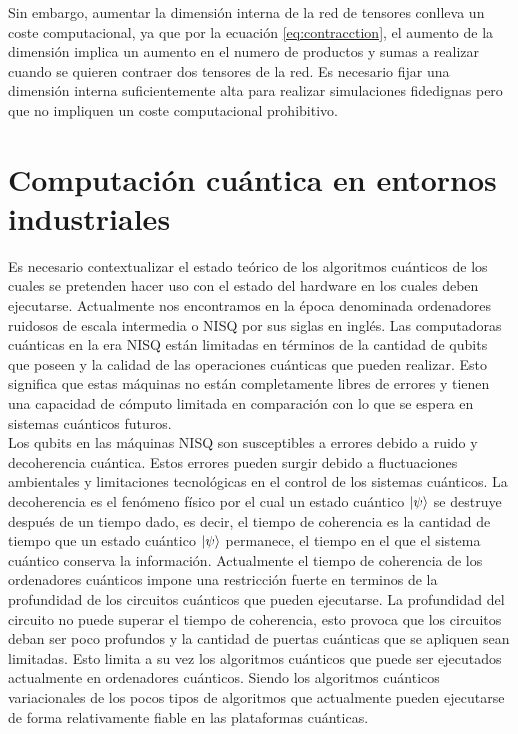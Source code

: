 \newpage

Sin embargo, aumentar la dimensión interna de la red de tensores conlleva un coste computacional, ya que por la ecuación \ref{eq:contracction}, el aumento de la dimensión implica un aumento en el numero de productos y sumas a realizar cuando se quieren contraer dos tensores de la red. Es necesario fijar una dimensión interna suficientemente alta para realizar simulaciones fidedignas pero que no impliquen un coste computacional prohibitivo.


\section{Computación cuántica en entornos industriales}

Es necesario contextualizar el estado teórico de los algoritmos cuánticos de los cuales se pretenden hacer uso con el estado del hardware en los cuales deben ejecutarse. Actualmente nos encontramos en la época denominada  ordenadores ruidosos de escala intermedia o NISQ por sus siglas en inglés. Las computadoras cuánticas en la era NISQ están limitadas en términos de la cantidad de qubits que poseen y la calidad de las operaciones cuánticas que pueden realizar. Esto significa que estas máquinas no están completamente libres de errores y tienen una capacidad de cómputo limitada en comparación con lo que se espera en sistemas cuánticos futuros. \\

 Los qubits en las máquinas NISQ son susceptibles a errores debido a ruido y decoherencia cuántica. Estos errores pueden surgir debido a fluctuaciones ambientales y limitaciones tecnológicas en el control de los sistemas cuánticos. La decoherencia es el fenómeno físico por el cual un estado cuántico $\ket{\psi}$ se destruye después de un tiempo dado, es decir, el tiempo de coherencia es la cantidad de tiempo que un estado cuántico $\ket{\psi}$ permanece, el tiempo en el que el sistema cuántico conserva la información. Actualmente el tiempo de coherencia de los ordenadores cuánticos impone una restricción fuerte en terminos de la profundidad de los circuitos cuánticos que pueden ejecutarse. La profundidad del circuito no puede superar el tiempo de coherencia, esto provoca que los circuitos deban ser poco profundos y la cantidad de puertas cuánticas que se apliquen sean limitadas. Esto limita a su vez los algoritmos cuánticos que puede ser ejecutados actualmente en ordenadores cuánticos. Siendo los algoritmos cuánticos variacionales de los pocos tipos de algoritmos que actualmente pueden ejecutarse de forma relativamente fiable en las plataformas cuánticas. 

